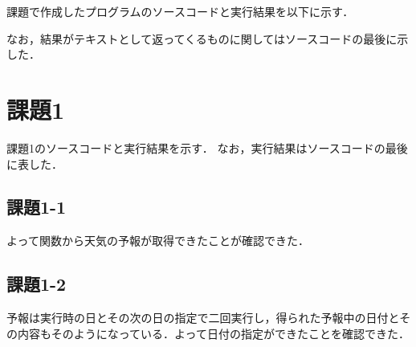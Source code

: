 
課題で作成したプログラムのソースコードと実行結果を以下に示す．

なお，結果がテキストとして返ってくるものに関してはソースコードの最後に示した．

\section{課題1}
課題1のソースコードと実行結果を示す．
なお，実行結果はソースコードの最後に表した．

\subsection{課題1-1}


よって関数から天気の予報が取得できたことが確認できた．

\subsection{課題1-2}


予報は実行時の日とその次の日の指定で二回実行し，得られた予報中の日付とその内容もそのようになっている．よって日付の指定ができたことを確認できた．
